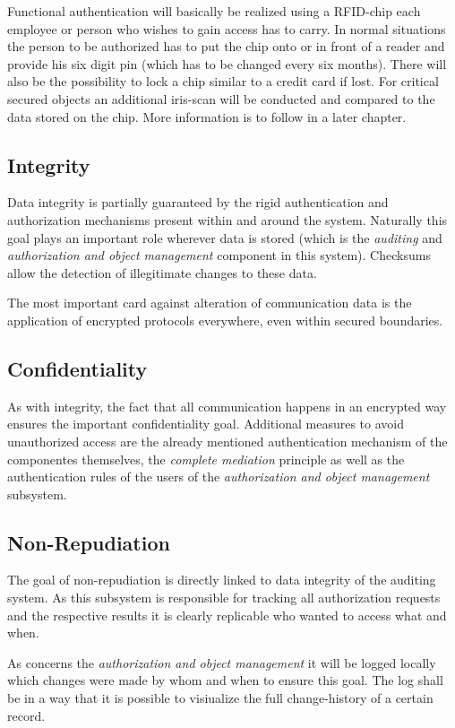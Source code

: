 \documentclass[12pt,a4paper,titlepage,oneside]{scrartcl}
\begin{document}
Functional authentication will basically be realized using a RFID-chip each employee or person who wishes to gain access has to carry.
In normal situations the person to be authorized has to put the chip onto or in front of a reader and provide his six digit pin
(which has to be changed every six months). There will also be the possibility to lock a chip similar to a credit card if lost.
For critical secured objects an additional iris-scan will be conducted and compared to the data stored on the chip.
More information is to follow in a later chapter.


\subsection{Integrity}
Data integrity is partially guaranteed by the rigid authentication and authorization mechanisms present within and around the system.
Naturally this goal plays an important role wherever data is stored (which is the \emph{auditing} and \emph{authorization and object management}
component in this system). Checksums allow the detection of illegitimate changes to these data.

The most important card against alteration of communication data is the application of encrypted protocols everywhere, even within
secured boundaries.


\subsection{Confidentiality}
As with integrity, the fact that all communication happens in an encrypted way ensures the important confidentiality goal. Additional
measures to avoid unauthorized access are the already mentioned authentication mechanism of the componentes themselves, the
\emph{complete mediation} principle as well as the authentication rules of the users of the \emph{authorization and object management}
subsystem.


\subsection{Non-Repudiation}
The goal of non-repudiation is directly linked to data integrity of the auditing system. As this subsystem is responsible for tracking
all authorization requests and the respective results it is clearly replicable who wanted to access what and when.

As concerns the \emph{authorization and object management} it will be logged locally which changes were made by whom and when to ensure
this goal. The log shall be in a way that it is possible to visiualize the full change-history of a certain record.
\end{document}
